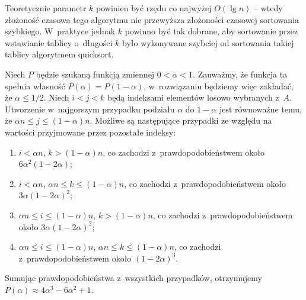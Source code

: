 Teoretycznie parametr $k$ powinien być rzędu co najwyżej $O(\lg n)$ -- wtedy złożoność czasowa tego algorytmu nie przewyższa złożoności czasowej sortowania szybkiego.
W~praktyce jednak $k$ powinno być tak dobrane, aby sortowanie przez wstawianie tablicy o~długości $k$ było wykonywane szybciej od sortowania takiej tablicy algorytmem quicksort.

\exercise %
Niech $P$ będzie szukaną funkcją zmiennej $0<\alpha<1$.
Zauważmy, że funkcja ta spełnia własność $P(\alpha)=P(1-\alpha)$, w~rozwiązaniu będziemy więc zakładać, że $\alpha\le1/2$.
Niech $i<j<k$ będą indeksami elementów losowo wybranych z~$A$.
Utworzenie w~najgorszym przypadku podziału $\alpha$ do $1-\alpha$ jest równoważne temu, że $\alpha n\le j\le(1-\alpha)n$.
Możliwe są następujące przypadki ze względu na wartości przyjmowane przez pozostałe indeksy:
\begin{enumerate}
	\renewcommand{\labelenumi}{(\roman{enumi})}
	\item $i<\alpha n$, $k>(1-\alpha)n$, co zachodzi z~prawdopodobieństwem około $6\alpha^2(1-2\alpha)$;
	\item $i<\alpha n$, $\alpha n\le k\le(1-\alpha)n$, co zachodzi z~prawdopodobieństwem około $3\alpha(1-2\alpha)^2$;
	\item $\alpha n\le i\le(1-\alpha)n$, $k>(1-\alpha)n$, co zachodzi z~prawdopodobieństwem około $3\alpha(1-2\alpha)^2$;
	\item $\alpha n\le i\le(1-\alpha)n$, $\alpha n\le k\le(1-\alpha)n$, co zachodzi z~prawdopodobieństwem około $(1-2\alpha)^3$.
\end{enumerate}
Sumując prawdopodobieństwa z~wszystkich przypadków, otrzymujemy $P(\alpha)\approx4\alpha^3-6\alpha^2+1$.
